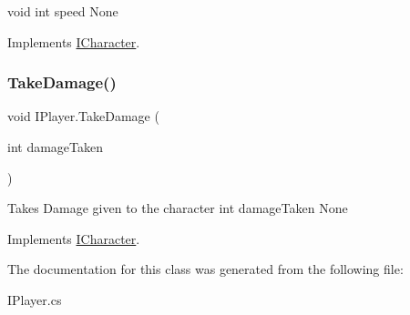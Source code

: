 void  int speed  None 

Implements \mbox{\hyperlink{interface_i_character}{I\+Character}}.

\mbox{\label{class_i_player_a8a19883d426fa172adc043332426d7ec}} 
\subsubsection{\texorpdfstring{Take\+Damage()}{TakeDamage()}}
{\footnotesize\ttfamily void I\+Player.\+Take\+Damage (\begin{DoxyParamCaption}\item[{int}]{damage\+Taken }\end{DoxyParamCaption})\hspace{0.3cm}{\ttfamily [inline]}}

Takes Damage given to the character  int damage\+Taken  None 

Implements \mbox{\hyperlink{interface_i_character}{I\+Character}}.



The documentation for this class was generated from the following file\+:\begin{DoxyCompactItemize}
\item 
I\+Player.\+cs\end{DoxyCompactItemize}
